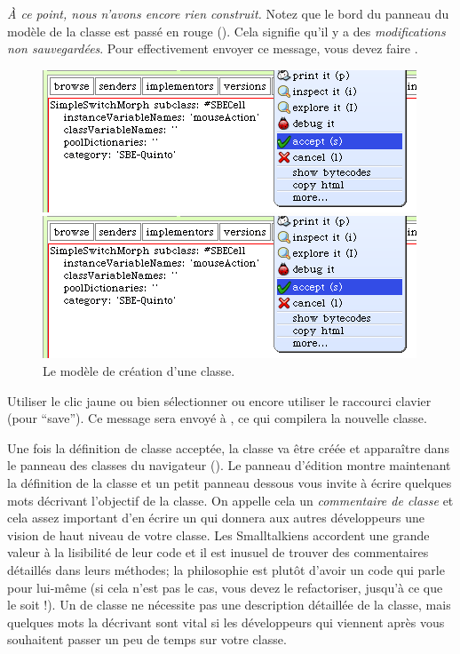 \documentclass[a4paper,10pt,twoside]{book}
\begin{document}
\emph{À ce point, nous n'avons encore rien construit.}
Notez que le bord du panneau du modèle de la classe est passé en rouge ().
Cela signifie qu'il y a des \emph{modifications non sauvegardées}.
Pour effectivement envoyer ce message, vous devez faire .

\begin{figure}[h!t]
\ifluluelse
	{\centerline {\includegraphics[width=\textwidth]{AcceptClassDef}}}
	{\centerline {\includegraphics[scale=0.7]{AcceptClassDef}}}
\caption{Le modèle de création d'une classe.
\label{fig:acceptClassDef}}
\end{figure}

Utiliser le clic jaune ou bien sélectionner  ou encore utiliser le raccourci clavier  (pour ``save'').
Ce message sera envoyé à , ce qui compilera la nouvelle classe.

Une fois la définition de classe acceptée, la classe va être créée et apparaître dans le panneau des classes du navigateur ().
Le panneau d'édition montre maintenant la définition de la classe et un petit panneau dessous vous invite à écrire quelques mots décrivant l'objectif de la classe. On appelle cela un \emph{commentaire de classe} et cela assez important d'en écrire un qui donnera aux autres développeurs une vision de haut niveau de votre classe.
Les Smalltalkiens accordent une grande valeur à la lisibilité de leur code et il est inusuel de trouver des commentaires détaillés dans leurs méthodes; la philosophie est plutôt d'avoir un code qui parle pour lui-même (si cela n'est pas le cas, vous devez le refactoriser, jusqu'à ce que le soit !). Un  de classe ne nécessite pas une description détaillée de la classe, mais quelques mots la décrivant sont vital si les développeurs qui viennent après vous souhaitent passer un peu de temps sur votre classe.
\end{document}

